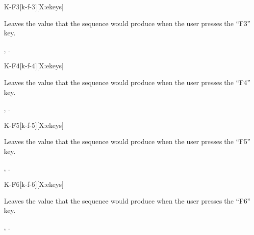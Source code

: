 \begin{worddef*}{}{K-F3}[k-f-3][X:ekeys]
\item {}

	Leaves the value  that the sequence 
	 would produce when the user presses the
	``F3'' key.


\see {},
	.
\end{worddef*}


\begin{worddef*}{}{K-F4}[k-f-4][X:ekeys]
\item {}

	Leaves the value  that the sequence 
	 would produce when the user presses the
	``F4'' key.


\see {},
	.
\end{worddef*}


\begin{worddef*}{}{K-F5}[k-f-5][X:ekeys]
\item {}

	Leaves the value  that the sequence 
	 would produce when the user presses the
	``F5'' key.


\see {},
	.
\end{worddef*}


\begin{worddef*}{}{K-F6}[k-f-6][X:ekeys]
\item {}

	Leaves the value  that the sequence 
	 would produce when the user presses the
	``F6'' key.


\see {},
	.
\end{worddef*}


